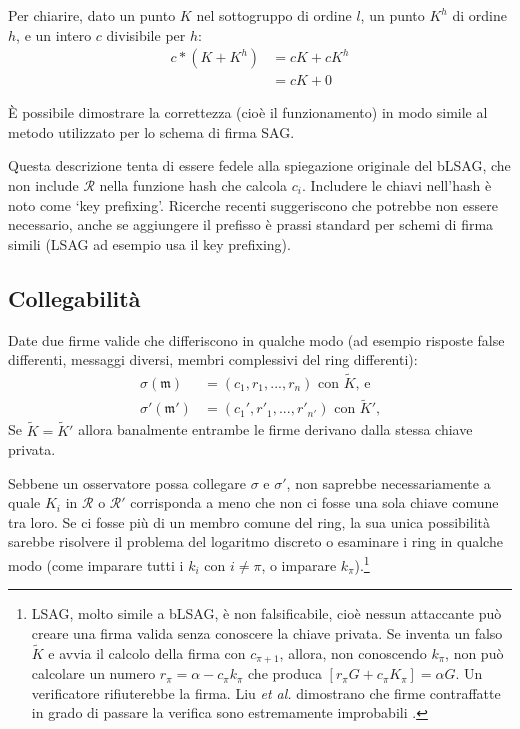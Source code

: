 Per chiarire, dato un punto \(K\) nel sottogruppo di ordine \(l\), un punto \(K^h\) di ordine \(h\), e un intero \(c\) divisibile per \(h\):
\begin{align*}
    c*(K + K^h) &= cK + cK^h \\
                &= cK + 0
\end{align*}

È possibile dimostrare la correttezza (cioè il funzionamento) in modo simile al metodo utilizzato per lo schema di firma SAG.

Questa descrizione tenta di essere fedele alla spiegazione originale del bLSAG, che non include \(\mathcal{R}\) nella funzione hash che calcola \(c_i\). Includere le chiavi nell'hash è noto come `key prefixing'. Ricerche recenti \cite{key-prefix-paper} suggeriscono che potrebbe non essere necessario, anche se aggiungere il prefisso è prassi standard per schemi di firma simili (LSAG ad esempio usa il key prefixing).


\subsection*{Collegabilità}

Date due firme valide che differiscono in qualche modo (ad esempio risposte false differenti, messaggi diversi, membri complessivi del ring differenti):\vspace{.1cm}
\begin{align*}
	\sigma(\mathfrak{m})   &= (c_1, r_1, ..., r_n)\textrm{ con } \tilde{K}\textrm{, e}\\
	\sigma'(\mathfrak{m}')  &= (c_1', r'_1, ..., r'_{n'})\textrm{ con } \tilde{K}'\textrm{,}
\end{align*}
\quad Se \(\tilde{K} =  \tilde{K}'\) allora banalmente entrambe le firme derivano dalla stessa chiave privata.%

Sebbene un osservatore possa collegare $\sigma$ e $\sigma'$, non saprebbe necessariamente a quale $K_i$ in $\mathcal{R}$ o $\mathcal{R}'$ corrisponda a meno che non ci fosse una sola chiave comune tra loro. Se ci fosse più di un membro comune del ring, la sua unica possibilità sarebbe risolvere il problema del logaritmo discreto o esaminare i ring in qualche modo (come imparare tutti i $k_i$ con $i \neq \pi$, o imparare $k_\pi$).\footnote{\label{lsag_unforgeable_note}LSAG, molto simile a bLSAG, è non falsificabile, cioè nessun attaccante può creare una firma valida senza conoscere la chiave privata. Se inventa un falso $\tilde{K}$ e avvia il calcolo della firma con $c_{\pi+1}$, allora, non conoscendo $k_\pi$, non può calcolare un numero $r_\pi = \alpha - c_\pi k_\pi$ che produca $[r_\pi G + c_\pi K_\pi] = \alpha G$. Un verificatore rifiuterebbe la firma. Liu {\em et al.} dimostrano che firme contraffatte in grado di passare la verifica sono estremamente improbabili \cite{Liu2004}.}



